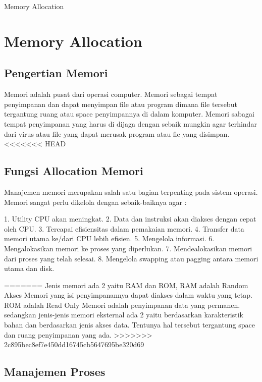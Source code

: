 
Memory Allocation

\section {Memory Allocation}

\subsection {Pengertian Memori}

Memori adalah pusat dari operasi computer. Memori sebagai tempat penyimpanan dan dapat menyimpan file atau program dimana file tersebut tergantung ruang atau space penyimpannya di dalam komputer. Memori sabagai tempat penyimpanan yang harus di dijaga dengan sebaik mungkin agar terhindar dari virus atau file yang dapat merusak program atau fie yang disimpan.
<<<<<<< HEAD

\subsection {Fungsi Allocation Memori}


Manajemen memori merupakan salah satu bagian terpenting pada sistem operasi. Memori sangat perlu dikelola dengan sebaik-baiknya agar :

1.	Utility CPU akan meningkat.
2.	Data dan instruksi akan diakses dengan cepat oleh CPU.
3.	Tercapai efisiensitas dalam pemakaian memori.
4.	Transfer data memori utama ke/dari CPU lebih efisien.
5.	Mengelola informasi. 
6.	Mengalokasikan memori ke proses yang diperlukan. 
7.	Mendealokasikan memori dari proses yang telah selesai. 
8.	Mengelola swapping atau pagging antara memori utama dan disk.


=======
Jenis memori ada 2 yaitu RAM dan ROM, RAM adalah Random Akses Memori yang isi penyimpanannya dapat diakses dalam waktu yang tetap. ROM adalah Read Only Memori adalah penyimpanan data yang permanen. sedangkan jenis-jenis memori eksternal ada 2 yaitu berdasarkan karakteristik bahan dan berdasarkan jenis akses data. Tentunya hal tersebut tergantung space dan ruang penyimpanan yang ada.
>>>>>>> 2c895bec8ef7e450dd16745cb5647695be320d69

\subsection {Manajemen Proses}

